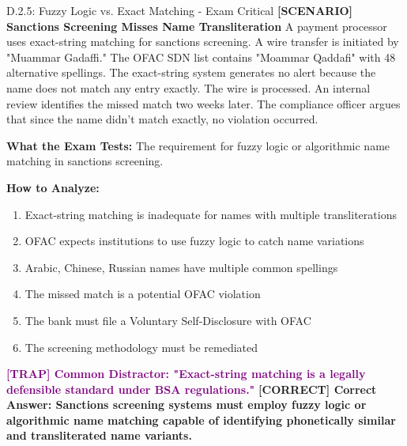 \documentclass[11pt,a4paper]{beamer}
\newcommand{\trap}[1]{\textcolor{purple}{\textbf{[TRAP] #1}}}
\newcommand{\correct}[1]{\textcolor{green!50!black}{\textbf{[CORRECT] #1}}}
\newcommand{\scenario}[1]{\textcolor{blue!70!black}{\textbf{[SCENARIO] #1}}}
\begin{document}
\begin{frame}{D.2.5: Fuzzy Logic vs. Exact Matching - Exam Critical}
	\scenario{Sanctions Screening Misses Name Transliteration}
	A payment processor uses exact-string matching for sanctions screening. A wire transfer is initiated by "Muammar Gadaffi." The OFAC SDN list contains "Moammar Qaddafi" with 48 alternative spellings. The exact-string system generates no alert because the name does not match any entry exactly. The wire is processed. An internal review identifies the missed match two weeks later. The compliance officer argues that since the name didn't match exactly, no violation occurred.
	
	\vspace{0.1cm}
	\textbf{What the Exam Tests:} The requirement for fuzzy logic or algorithmic name matching in sanctions screening.
	
	\vspace{0.1cm}
	\textbf{How to Analyze:}
	\begin{enumerate}
		\item Exact-string matching is inadequate for names with multiple transliterations
		\item OFAC expects institutions to use fuzzy logic to catch name variations
		\item Arabic, Chinese, Russian names have multiple common spellings
		\item The missed match is a potential OFAC violation
		\item The bank must file a Voluntary Self-Disclosure with OFAC
		\item The screening methodology must be remediated
	\end{enumerate}
	
	\trap{Common Distractor: "Exact-string matching is a legally defensible standard under BSA regulations."}
	\correct{Correct Answer: Sanctions screening systems must employ fuzzy logic or algorithmic name matching capable of identifying phonetically similar and transliterated name variants.}
\end{frame}
\end{document}
